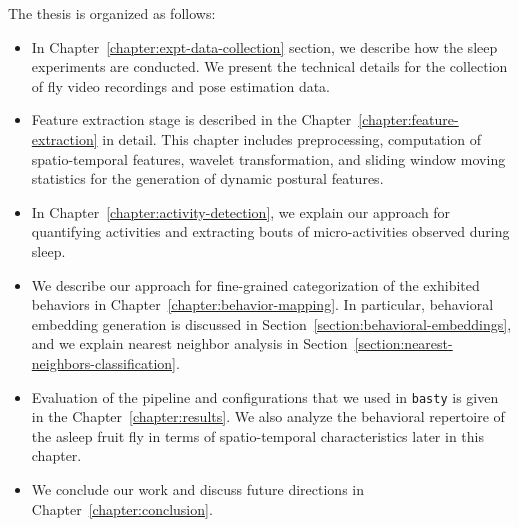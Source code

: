 The thesis is organized as follows:
\begin{itemize}
	\item In Chapter~\ref{chapter:expt-data-collection} section, we describe how the sleep experiments are conducted.
	      We present the technical details for the collection of fly video recordings and pose estimation data.
	\item Feature extraction stage is described in the Chapter~\ref{chapter:feature-extraction} in detail.
	      This chapter includes preprocessing, computation of spatio-temporal features, wavelet transformation, and sliding window moving statistics for the generation of dynamic postural features.
	\item In Chapter~\ref{chapter:activity-detection}, we explain our approach for quantifying activities and extracting bouts of micro-activities observed during sleep.
	\item We describe our approach for fine-grained categorization of the exhibited behaviors in Chapter~\ref{chapter:behavior-mapping}.
	      In particular, behavioral embedding generation is discussed in Section~\ref{section:behavioral-embeddings}, and we explain nearest neighbor analysis in Section~\ref{section:nearest-neighbors-classification}.
	\item Evaluation of the pipeline and configurations that we used in \texttt{basty} is given in the Chapter~\ref{chapter:results}.
	      We also analyze the behavioral repertoire of the asleep fruit fly in terms of spatio-temporal characteristics later in this chapter.
	\item We conclude our work and discuss future directions in Chapter~\ref{chapter:conclusion}.
\end{itemize}
